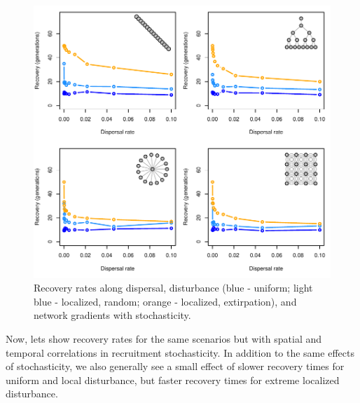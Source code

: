 \documentclass[]{article}
\begin{document}
\begin{figure}[H]

{\centering \includegraphics{Managing_for_ecological_surprises_in_metapopulations_makeHTML_files/figure-latex/stochastic recruitment-1} 

}

\caption{Recovery rates along dispersal, disturbance (blue - uniform; light blue - localized, random; orange - localized, extirpation), and network gradients with stochasticity.}\label{fig:stochastic recruitment}
\end{figure}

 Now, lets show recovery rates for the same scenarios but with spatial
and temporal correlations in recruitment stochasticity. In addition to
the same effects of stochasticity, we also generally see a small effect
of slower recovery times for uniform and local disturbance, but faster
recovery times for extreme localized disturbance.
\end{document}
